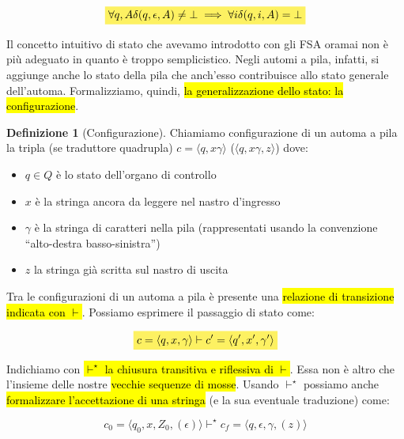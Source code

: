 \documentclass[a4paper,11pt,oneside]{article}
\theoremstyle{plain}
\theoremstyle{definition}
\newtheorem{defn}{Definizione}[section]
\theoremstyle{remark}
\newcommand{\mhl}[1]{\colorbox{hlcolor}{$\displaystyle #1$}}
\begin{document}
\begin{equation}
  \mhl{
  \forall q, A \delta(q, \epsilon, A) \neq \bot \implies
    \forall i \delta(q,i,A) = \bot
  }
\end{equation}

Il concetto intuitivo di stato che avevamo introdotto con gli FSA oramai non è
più adeguato in quanto è troppo semplicistico. Negli automi a pila, infatti, si
aggiunge anche lo stato della pila che anch'esso contribuisce allo stato
generale dell'automa. Formalizziamo, quindi, \hl{la generalizzazione dello
stato: la configurazione}.

\begin{defn}[Configurazione]\label{def:configurazione}
  Chiamiamo configurazione di un automa a pila la tripla (se traduttore
  quadrupla) $c = \langle q, x \gamma \rangle$
  ($\langle q, x \gamma, z \rangle$) dove:

  \begin{itemize}
    \item $q \in Q$ è lo stato dell'organo di controllo
    \item $x$ è la stringa ancora da leggere nel nastro d'ingresso
    \item $\gamma$ è la stringa di caratteri nella pila (rappresentati usando la
      convenzione ``alto-destra basso-sinistra'')
    \item $z$ la stringa già scritta sul nastro di uscita
  \end{itemize}
\end{defn}

Tra le configurazioni di un automa a pila è presente una \hl{relazione di
transizione indicata con $\vdash$}. Possiamo esprimere il passaggio di stato
come:

\begin{equation}
  \mhl{
  c = \langle q, x, \gamma \rangle \vdash c' = \langle q', x', \gamma' \rangle
  }
\end{equation}

Indichiamo con \hl{$\vdash^\star$ la chiusura transitiva e riflessiva di $\vdash$}. Essa
non è altro che l'insieme delle nostre \hl{vecchie sequenze di mosse}. Usando
$\vdash^\star$ possiamo anche \hl{formalizzare l'accettazione di una stringa} (e la sua
eventuale traduzione) come:

\begin{equation}
  c_0 = \langle q_0, x, Z_0, (\epsilon) \rangle \vdash^\star
    c_f = \langle q, \epsilon, \gamma , (z) \rangle
\end{equation}
\end{document}
